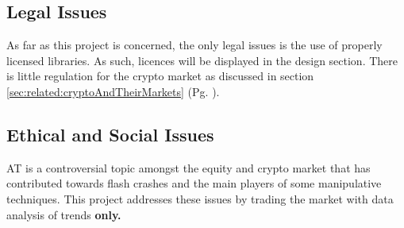 \subsection{Legal Issues}
As far as this project is concerned, the only legal issues is the use of properly licensed libraries. As such, licences will be displayed in the design section. There is little regulation for the crypto market as discussed in section \ref{sec:related:cryptoAndTheirMarkets} (Pg. \pageref{sec:related:cryptoAndTheirMarkets}).

\subsection{Ethical and Social Issues}
AT is a controversial topic amongst the equity and crypto market that has contributed towards flash crashes and the main players of some manipulative techniques. This project addresses these issues by trading the market with data analysis of trends \textbf{only.}  
